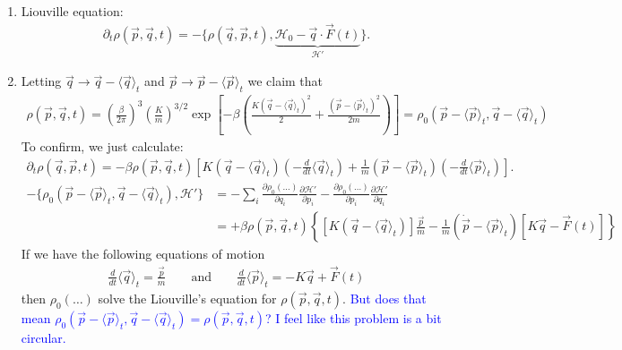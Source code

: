 \documentclass{article}
\theoremstyle{definition}
\newcommand{\p}{\partial}
\newcommand{\ham}{\mathcal{H}}
\newcommand{\be}{\beta}
\newcommand{\f}[2]{\frac{#1}{#2}}
\newcommand{\lp}{\left(}
\newcommand{\rp}{\right)}
\newcommand{\lb}{\left[}
\newcommand{\rb}{\right]}
\newcommand{\lc}{\left\{}
\newcommand{\rc}{\right\}}
\begin{document}
\begin{enumerate}[label=(\alph*)]
	\item Liouville equation:
	\begin{align*}
	\p_t \rho(\vec{p},\vec{q}, t) = -\{\rho(\vec{q},\vec{p},t), \underbrace{\ham_0 - \vec{q}\cdot \vec{F}(t)}_{\ham'}\}.
	\end{align*}
	
	
	\item Letting $\vec{q} \to \vec{q} - \langle \vec{q} \rangle_t$ and $\vec{p} \to \vec{p} - \langle \vec{p}\rangle_t$ we claim that
	\begin{align*}
	\rho(\vec{p}, \vec{q},t) = {\lp \f{\be}{2\pi} \rp^3 \lp \f{K}{m} \rp^{3/2}} \exp\lb -\be\lp \f{K(\vec{q} - \langle \vec{q} \rangle_t)^2}{2} + \f{(\vec{p} - \langle \vec{p}\rangle_t)^2}{2m} \rp \rb = \rho_0(\vec{p} - \langle \vec{p}\rangle_t , \vec{q} - \langle \vec{q}\rangle_t)
	\end{align*}
	To confirm, we just calculate:
	\begin{align*}
	\p_t \rho(\vec{q},\vec{p},t) = -\be \rho(\vec{p},\vec{q},t) \lb K(\vec{q} - \langle \vec{q} \rangle_t )\lp - \f{d}{d t} \langle \vec{q}\rangle_t\rp + \f{1}{m}(\vec{p} - \langle \vec{p} \rangle_t)\lp - \f{d}{d t} \langle \vec{p} \rangle_t \rp \rb.
	\end{align*}
	\begin{align*}
	-\{\rho_0(\vec{p} - \langle \vec{p}\rangle_t , \vec{q} - \langle \vec{q}\rangle_t), \ham' \}
	&= -\sum_i \f{\p \rho_0(\dots)}{\p q_i}\f{\p \ham'}{\p p_i} - \f{\p \rho_0(\dots)}{\p p_i}\f{\p \ham'}{\p q_i}\\
	&= +\be \rho(\vec{p},\vec{q},t)\lc  \lb K(\vec{q} - \langle \vec{q}\rangle_t) \rb \f{\vec{p}}{m} -\f{1}{m}(\dot{\vec{p}} -  \langle \vec{p}\rangle_t)   \lb K\vec{q} -\vec{F}(t) \rb \rc
	\end{align*}
	If we have the following equations of motion
	\begin{align*}
	\boxed{\f{d}{dt}\langle \vec{q} \rangle_t =  \f{\vec{p}}{m}} \quad\quad \text{and} \quad\quad \boxed{\f{d}{dt}\langle \vec{p} \rangle_t = - K\vec{q} + \vec{F}(t)}
	\end{align*}
	then $\rho_0(\dots)$ solve the Liouville's equation for $\rho(\vec{p},\vec{q},t)$. \textcolor{blue}{But does that mean $\rho_0(\vec{p} - \langle \vec{p}\rangle_t, \vec{q} - \langle \vec{q} \rangle_t) = \rho(\vec{p},\vec{q},t)$? I feel like this problem is a bit circular.}
	
	
	

\end{enumerate}
\end{document}
